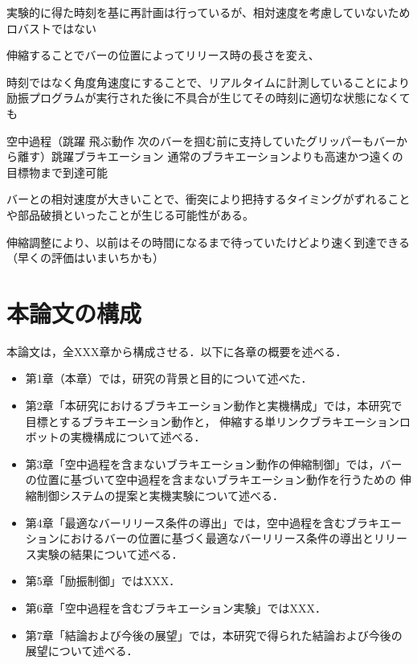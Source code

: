           実験的に得た時刻を基に再計画は行っているが、相対速度を考慮していないためロバストではない

          伸縮することでバーの位置によってリリース時の長さを変え、

          時刻ではなく角度角速度にすることで、リアルタイムに計測していることにより励振プログラムが実行された後に不具合が生じてその時刻に適切な状態になくても

          空中過程（跳躍 飛ぶ動作 次のバーを掴む前に支持していたグリッパーもバーから離す）跳躍ブラキエーション
          通常のブラキエーションよりも高速かつ遠くの目標物まで到達可能
          
          バーとの相対速度が大きいことで、衝突により把持するタイミングがずれることや部品破損といったことが生じる可能性がある。

          伸縮調整により、以前はその時間になるまで待っていたけどより速く到達できる（早くの評価はいまいちかも）


        \section{本論文の構成}

          本論文は，全XXX章から構成させる．以下に各章の概要を述べる．
          \begin{itemize}
            \item 第1章（本章）では，研究の背景と目的について述べた．
            \item 第2章「本研究におけるブラキエーション動作と実機構成」では，本研究で目標とするブラキエーション動作と，
            伸縮する単リンクブラキエーションロボットの実機構成について述べる．
            \item 第3章「空中過程を含まないブラキエーション動作の伸縮制御」では，バーの位置に基づいて空中過程を含まないブラキエーション動作を行うための
            伸縮制御システムの提案と実機実験について述べる．
            \item 第4章「最適なバーリリース条件の導出」では，空中過程を含むブラキエーションにおけるバーの位置に基づく最適なバーリリース条件の導出とリリース実験の結果について述べる．
            \item 第5章「励振制御」ではXXX．
            \item 第6章「空中過程を含むブラキエーション実験」ではXXX．
            \item 第7章「結論および今後の展望」では，本研究で得られた結論および今後の展望について述べる．
          \end{itemize}

